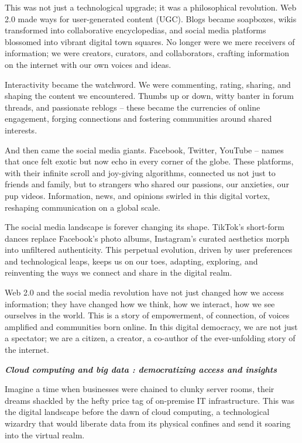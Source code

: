 \documentclass[
  letterpaper,
  DIV=11,
  numbers=noendperiod]{scrreprt}
\begin{document}
This was not just a technological upgrade; it was a philosophical
revolution. Web 2.0 made ways for user-generated content (UGC). Blogs
became soapboxes, wikis transformed into collaborative encyclopedias,
and social media platforms blossomed into vibrant digital town squares.
No longer were we mere receivers of information; we were creators,
curators, and collaborators, crafting information on the internet with
our own voices and ideas.

Interactivity became the watchword. We were commenting, rating, sharing,
and shaping the content we encountered. Thumbs up or down, witty banter
in forum threads, and passionate reblogs -- these became the currencies
of online engagement, forging connections and fostering communities
around shared interests.

And then came the social media giants. Facebook, Twitter, YouTube --
names that once felt exotic but now echo in every corner of the globe.
These platforms, with their infinite scroll and joy-giving algorithms,
connected us not just to friends and family, but to strangers who shared
our passions, our anxieties, our pup videos. Information, news, and
opinions swirled in this digital vortex, reshaping communication on a
global scale.

The social media landscape is forever changing its shape. TikTok's
short-form dances replace Facebook's photo albums, Instagram's curated
aesthetics morph into unfiltered authenticity. This perpetual evolution,
driven by user preferences and technological leaps, keeps us on our
toes, adapting, exploring, and reinventing the ways we connect and share
in the digital realm.

Web 2.0 and the social media revolution have not just changed how we
access information; they have changed how we think, how we interact, how
we see ourselves in the world. This is a story of empowerment, of
connection, of voices amplified and communities born online. In this
digital democracy, we are not just a spectator; we are a citizen, a
creator, a co-author of the ever-unfolding story of the internet.

\textbf{\emph{Cloud computing and big data : democratizing access and
insights}}

Imagine a time when businesses were chained to clunky server rooms,
their dreams shackled by the hefty price tag of on-premise IT
infrastructure. This was the digital landscape before the dawn of cloud
computing, a technological wizardry that would liberate data from its
physical confines and send it soaring into the virtual realm.
\end{document}
